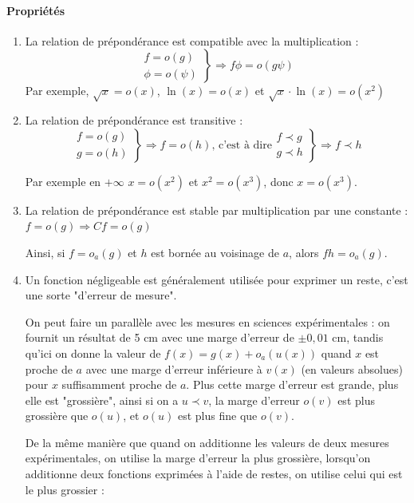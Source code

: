 \documentclass[]{article}
\begin{document}
\paragraph{Propriétés}
\begin{enumerate}
	\item La relation de prépondérance est compatible avec la multiplication : 
	$$\left. \begin{array}{c}
		f=o(g) \\
		\phi = o(\psi)
	\end{array} \right\} \Longrightarrow f \phi = o(g \psi)$$
	Par exemple, $\sqrt{x}=o(x)$, $\ln(x)=o(x)$ et $\sqrt{x} \cdot \ln(x)=o(x^2)$
	
	\newpage
	\item La relation de prépondérance est transitive : 
	$$\left. \begin{array}{c}
		f=o(g) \\
		g = o(h)
	\end{array} \right\} \Longrightarrow f = o(h) \text{, c'est à dire} \left. \begin{array}{c}
			f \prec g \\
			g \prec h
		\end{array} \right\} \Longrightarrow f \prec h
	$$

	Par exemple en $+ \infty$ $x=o(x^2)$ et $x^2=o(x^3)$, donc $x=o(x^3)$.
	
	\item La relation de prépondérance est stable par multiplication par une constante : $f=o(g) \Longrightarrow Cf = o(g)$
	
	Ainsi, si $f=o_a(g)$ et $h$ est bornée au voisinage de $a$, alors $fh=o_a(g)$.
	
	\item Un fonction négligeable est généralement utilisée pour exprimer un reste, c'est une sorte "d'erreur de mesure".
	
	On peut faire un parallèle avec les mesures en sciences expérimentales : on fournit un résultat de 5 cm avec une marge d'erreur de $\pm 0,01$ cm, tandis qu'ici on donne la valeur de $f(x)=g(x)+o_a(u(x))$ quand $x$ est proche de $a$ avec une marge d'erreur inférieure à $v(x)$ (en valeurs absolues) pour $x$ suffisamment proche de $a$. Plus cette marge d'erreur est grande, plus elle est "grossière", ainsi si on a $u \prec v$, la marge d'erreur $o(v)$ est plus grossière que $o(u)$, et $o(u)$ est plus fine que $o(v)$.
	
	De la même manière que quand on additionne les valeurs de deux mesures expérimentales, on utilise la marge d'erreur la plus grossière, lorsqu'on additionne deux fonctions exprimées à l'aide de restes, on utilise celui qui est le plus grossier :
	

\end{enumerate}
\end{document}
